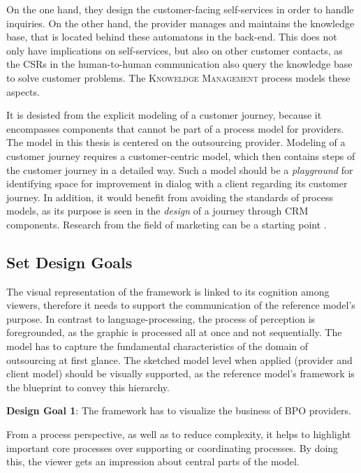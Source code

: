 	On the one hand, they design the customer-facing self-services in order to handle inquiries. On the other hand, the provider manages and maintains the knowledge base, that is located behind these automatons in the back-end. This does not only have implications on self-services, but also on other customer contacts, as the \acrshort{CSR}s in the human-to-human communication also query the knowledge base to solve customer problems. The \textsc{Knoweldge Management} process models these aspects.
	
	It is desisted from the explicit modeling of a customer journey, because it encompasses components that cannot be part of a process model for providers. The model in this thesis is centered on the outsourcing provider. Modeling of a customer journey requires a customer-centric model, which then contains steps of the customer journey in a detailed way. Such a model should be a \textit{playground} for identifying space for improvement in dialog with a client regarding its customer journey. In addition, it would benefit from avoiding the standards of process models, as its purpose is seen in the \textit{design} of a journey through \acrshort{CRM} components. Research from the field of marketing can be a starting point \citep{Lemon_2016, Frow_2007}. 
	
	\subsection{Set Design Goals}
	
	The visual representation of the framework is linked to its cognition among viewers, therefore it needs to support the communication of the reference model's purpose. In contrast to language-processing, the process of perception is foregrounded, as the graphic is processed all at once and not sequentially. The model has to capture the fundamental characteristics of the domain of outsourcing at first glance. The sketched model level when applied (provider and client model) should be visually supported, as the reference model's framework is the blueprint to convey this hierarchy. 
	
	\hfill\begin{minipage}{\dimexpr\textwidth-1.2cm}
		\textbf{Design Goal 1}: The framework has to visualize the business of BPO providers.
	\end{minipage}

From a process perspective, as well as to reduce complexity, it helps to highlight important core processes over supporting or coordinating processes. By doing this, the viewer gets an impression about central parts of the model. 

